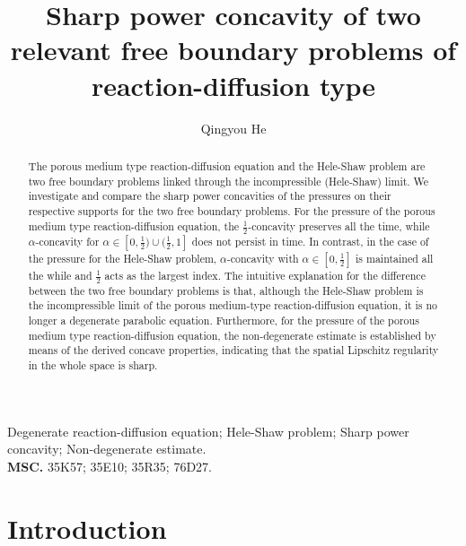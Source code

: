 \documentclass[10pt]{article}         %
\title{Sharp power concavity of two relevant  free boundary problems of reaction-diffusion type}
\author{Qingyou He}%
\date{}           %
\numberwithin{equation}{section}
\begin{document}
\maketitle
\begin{abstract} The porous medium type reaction-diffusion equation and the Hele-Shaw problem are two free boundary problems linked through the incompressible (Hele-Shaw) limit.  We investigate and compare the sharp power concavities of the pressures on their respective supports for the two free boundary problems. For the pressure of the porous medium type reaction-diffusion equation, the $\frac{1}{2}$-concavity preserves all the time, while $\alpha$-concavity for $\alpha\in[0,\frac{1}{2})\cup(\frac{1}{2},1]$ does not persist in time. In contrast, in the case of the pressure for the Hele-Shaw problem, $\alpha$-concavity with $\alpha\in[0,\frac{1}{2}]$ is maintained all the while and  $\frac{1}{2}$ acts as the largest index. The intuitive explanation for the difference between the two free boundary problems is that, although the Hele-Shaw problem is the incompressible limit of the porous medium-type reaction-diffusion equation, it is no longer a degenerate parabolic equation. Furthermore, for the pressure of the porous medium type reaction-diffusion equation, the non-degenerate estimate is established by means of the derived concave properties, indicating that the spatial Lipschitz regularity in the whole space is sharp.
\end{abstract}

 Degenerate reaction-diffusion equation; Hele-Shaw problem; Sharp power concavity; Non-degenerate estimate.\\
 {\bf MSC.} 35K57; 35E10; 35R35; 76D27.

\section{Introduction}
\end{document}
